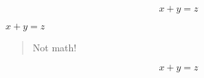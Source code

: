 \begin{equation*}
    x + y = z
\end{equation*}

$ x + y = z $

\begin{quote}
    Not math!
\end{quote}

\[ x + y = z \]
